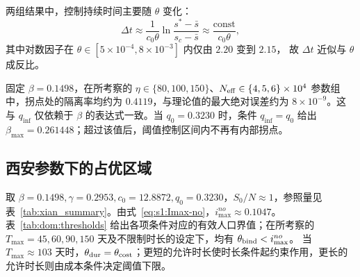 \documentclass[lang=cn,a4paper,newtx]{elegantpaper}
\numberwithin{equation}{section}
\theoremstyle{plain}
\newcommand{\qinf}{q_{\mathrm{inf}}}
\begin{document}
两组结果中，控制持续时间主要随 $\theta$ 变化：
\[
\Delta t\approx\frac{1}{c_0\theta}\ln\frac{s^*-\bar s}{s_c-\bar s}\approx\frac{\text{const}}{c_0\theta},
\]
其中对数因子在 $\theta\in[5\times10^{-4},8\times10^{-3}]$ 内仅由 $2.20$ 变到 $2.15$，
故 $\Delta t$ 近似与 $\theta$ 成反比。





固定 $\beta=0.1498$，在所考察的 $\eta\in\{80,100,150\}$、$N_{\rm eff}\in\{4,5,6\}\times10^4$ 参数组中，拐点处的隔离率均约为 $0.4119$，与理论值的最大绝对误差约为 $8\times10^{-9}$。这与 $\qinf$ 仅依赖于 $\beta$ 的表达式一致。当 $q_0=0.3230$ 时，条件 $\qinf=q_0$ 给出 $\beta_{\max}=0.261448$；超过该值后，阈值控制区间内不再有内部拐点。

\subsection{西安参数下的占优区域}
\label{sec:dom:xian}

取 $\beta=0.1498,\gamma=0.2953,c_0=12.8872,q_0=0.3230$，$S_0/N\approx1$，参照量见表~\ref{tab:xian_summary}。由式~\eqref{eq:s1:Imax-no}，$i_{\max}^{no}\approx0.1047$。表~\ref{tab:dom:thresholds} 给出各项条件对应的有效人口界值；在所考察的 $T_{\max}=45,60,90,150$ 天及不限制时长的设定下，均有 $\theta_{\rm bind}<i_{\max}^{no}$。
当 $T_{\max}\approx103$ 天时，$\theta_{\rm dur}=\theta_{\rm cost}$；更短的允许时长使时长条件起约束作用，更长的允许时长则由成本条件决定阈值下限。
\end{document}
